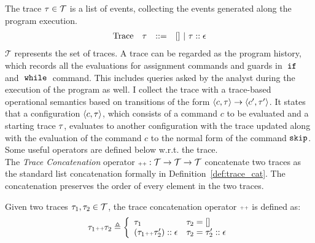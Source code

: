 The trace $\mathtt{\tau} \in \mathcal{T} $ is a list of events, 
collecting the events generated along the program execution. 
\[
\begin{array}{llll}
\mbox{Trace} & \mathtt{\tau}
& ::= & [] ~|~ \mathtt{\tau} :: \mathtt{\epsilon}
\end{array}
\]
$\mathcal{T} $ represents the set of traces. 
A trace can be regarded as the program history, 
which records all the evaluations for assignment commands and guards in $\;\mathtt{if}\;$ and $\;\mathtt{while}\;$ command.
This includes queries asked by the analyst during the execution of the program as well. 
I collect the trace with a trace-based operational semantics based on transitions 
of the form $ \langle c, \mathtt{\tau} \rangle \to \langle c', \mathtt{\tau}' \rangle $. 
It states that a configuration $\langle c, \mathtt{\tau} \rangle$,
which consists of a command $c$ to be evaluated and a starting trace $\mathtt{\tau}$, 
evaluates to another configuration with the trace updated along with the evaluation of the command $c$ to the normal form of the command $\mathtt{skip}$.
%
\\
Some useful operators are defined below w.r.t. the trace.
\\
The \emph{Trace Concatenation} operator ${\scriptscriptstyle ++}: \mathcal{T} \to \mathcal{T} \to \mathcal{T}$ concatenate two traces
as the standard list concatenation formally
in Definition~\ref{def:trace_cat}.
The concatenation preserves the order of every element in the two traces.
\begin{defn}
  \label{def:trace_cat}
  Given two traces $\mathtt{\tau}_1, \mathtt{\tau}_2 \in \mathcal{T}$, the trace concatenation operator 
  ${\scriptscriptstyle ++}$ is defined as:
  \[
    \trace_1 \tracecat \trace_2 \triangleq
    \left\{
    \begin{array}{ll} 
       \trace_1 & \trace_2 = [] \\
       (\trace_1  \tracecat \trace_2')  :: \event & \trace_2 = \trace_2' :: \event
    \end{array}
    \right.
  \]
  \end{defn}
  
